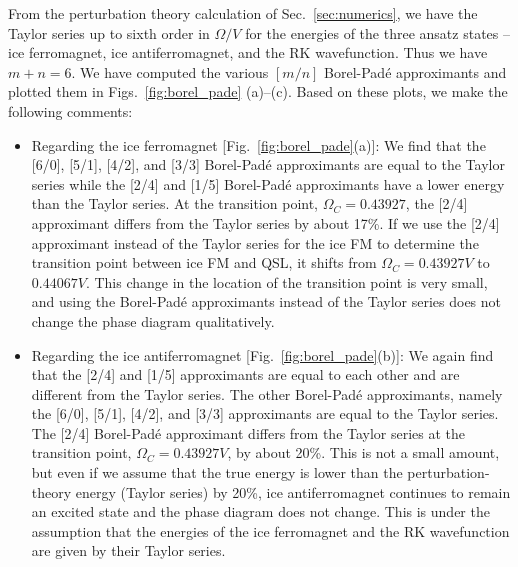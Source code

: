 \documentclass[twocolumn,superscriptaddress,amsmath,amssymb,aps,prx,nofootinbib]{revtex4-2}
\begin{document}
From the perturbation theory calculation of Sec.~\ref{sec:numerics}, we have the Taylor series up to sixth order in $\Omega/V$ for the energies of the three ansatz states -- ice ferromagnet, ice antiferromagnet, and the RK wavefunction. Thus we have $m+n=6$. We have computed the various $[m/n]$ Borel-Pad\'e approximants and plotted them in Figs.~\ref{fig:borel_pade} (a)--(c). Based on these plots, we make the following comments:
\begin{itemize}
    \item Regarding the ice ferromagnet [Fig.~\ref{fig:borel_pade}(a)]: We find that the [6/0], [5/1], [4/2],  and [3/3] Borel-Pad\'e approximants are equal to the Taylor series while the [2/4] and [1/5] Borel-Pad\'e approximants have a lower energy than the Taylor series.
    At the transition point, $\Omega_C = 0.43927$, the [2/4] approximant differs from the Taylor series by about 17\%.
    If we use the [2/4] approximant instead of the Taylor series for the ice FM to determine the transition point between ice FM and QSL, it shifts from $\Omega_C = 0.43927 V$ to $0.44067 V$. 
    This change in the location of the transition point is very small, and using the Borel-Pad\'e approximants instead of the Taylor series does not change the phase diagram qualitatively.
    \item Regarding the ice antiferromagnet [Fig.~\ref{fig:borel_pade}(b)]: We again find that the [2/4] and [1/5] approximants are equal to each other and are different from the Taylor series. The other Borel-Pad\'e approximants, namely the [6/0], [5/1], [4/2], and [3/3] approximants are equal to the Taylor series. The [2/4] Borel-Pad\'e approximant differs from the Taylor series at the transition point, $\Omega_C = 0.43927 V$, by about 20\%. This is not a small amount, but even if we assume that the true energy is lower than the perturbation-theory energy (Taylor series) by 20\%, ice antiferromagnet continues to remain an excited state and the phase diagram does not change. This is under the assumption that the energies of the ice ferromagnet and the RK wavefunction are given by their Taylor series.


\end{itemize}
\end{document}
